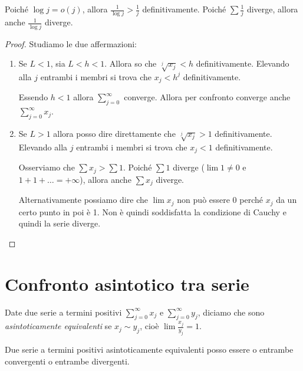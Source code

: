 Poiché $\log j = o(j)$, allora $\frac{1}{\log j} > \frac{1}{j}$ definitivamente. Poiché $\sum \frac{1}{j}$ diverge, allora anche $\frac{1}{\log j}$ diverge.

\begin{proof}
Studiamo le due affermazioni:
\begin{enumerate}
\item 
Se $L < 1$, sia $L < h < 1$. Allora so che $\sqrt[j]{x_j} < h$ definitivamente. Elevando alla $j$ entrambi i membri si trova che $x_j < h^j$ definitivamente.

Essendo $h < 1$ allora $\sum_{j=0}^\infty$ converge. Allora per confronto converge anche $\sum_{j=0}^\infty x_j$.

\item Se $L > 1$ allora posso dire direttamente che  $\sqrt[j]{x_j} > 1$ definitivamente. Elevando alla $j$ entrambi i membri si trova che $x_j < 1$ definitivamente.

Osserviamo che $\sum x_j > \sum 1$. Poiché $\sum 1$ diverge ($\lim 1 \neq 0$ e $1 + 1 + \ldots = +\infty$), allora anche $\sum x_j$ diverge.

Alternativamente possiamo dire che $\lim x_j$ non può essere 0 perché $x_j$ da un certo punto in poi è 1. Non è quindi soddisfatta la condizione di Cauchy e quindi la serie diverge.
\end{enumerate}
\end{proof}

\section{Confronto asintotico tra serie}
\begin{definition}
Date due serie a termini positivi $\sum_{j=0}^\infty x_j$ e $\sum_{j=0}^\infty y_j$, diciamo che sono \emph{asintoticamente equivalenti} se $x_j \sim y_j$, cioè $\lim \frac{x_j}{y_j} = 1$.
\end{definition}

\begin{theorem}
Due serie a termini positivi asintoticamente equivalenti posso essere o entrambe convergenti o entrambe divergenti.
\end{theorem}

